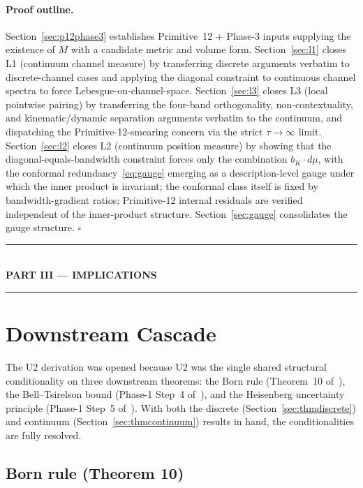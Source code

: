 \documentclass[11pt,a4paper]{article}
\begin{document}
\paragraph{Proof outline.} Section~\ref{sec:p12phase3} establishes Primitive~12 + Phase-3 inputs supplying the existence of $M$ with a candidate metric and volume form. Section~\ref{sec:l1} closes L1 (continuum channel measure) by transferring discrete arguments verbatim to discrete-channel cases and applying the diagonal constraint to continuous channel spectra to force Lebesgue-on-channel-space. Section~\ref{sec:l3} closes L3 (local pointwise pairing) by transferring the four-band orthogonality, non-contextuality, and kinematic/dynamic separation arguments verbatim to the continuum, and dispatching the Primitive-12-smearing concern via the strict $\tau \to \infty$ limit. Section~\ref{sec:l2} closes L2 (continuum position measure) by showing that the diagonal-equals-bandwidth constraint forces only the combination $b_K \cdot d\mu$, with the conformal redundancy~\eqref{eq:gauge} emerging as a description-level gauge under which the inner product is invariant; the conformal class itself is fixed by bandwidth-gradient ratios; Primitive-12 internal residuals are verified independent of the inner-product structure. Section~\ref{sec:gauge} consolidates the gauge structure. \hfill$\square$

\begin{center}
\rule{0.3\linewidth}{0.4pt}\\[0.5em]
{\large\bfseries PART III --- IMPLICATIONS}\\[0.2em]
\rule{0.3\linewidth}{0.4pt}
\end{center}

\section{Downstream Cascade}\label{sec:cascade}

The U2 derivation was opened because U2 was the single shared structural conditionality on three downstream theorems: the Born rule (Theorem~10 of~\cite{borngleason}), the Bell--Tsirelson bound (Phase-1 Step~4 of~\cite{phase1}), and the Heisenberg uncertainty principle (Phase-1 Step~5 of~\cite{phase1}). With both the discrete (Section~\ref{sec:thmdiscrete}) and continuum (Section~\ref{sec:thmcontinuum}) results in hand, the conditionalities are fully resolved.

\subsection{Born rule (Theorem 10)}
\end{document}
